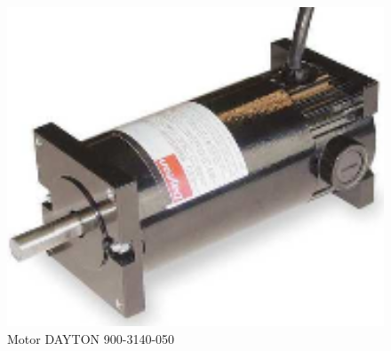 \begin{figure}
\centering
\includegraphics[width=4.5in]{fotos/motor}
\caption{Motor DAYTON 900-3140-050}
\label{fig:fotos:motor}
\end{figure}
